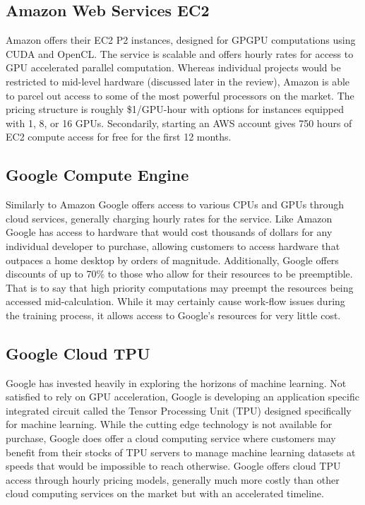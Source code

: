 \documentclass[onecolumn, draftclsnofoot,10pt, compsoc]{IEEEtran}
\begin{document}
    \subsection{Amazon Web Services EC2}
    Amazon offers their EC2 P2 instances, designed for GPGPU computations using CUDA and OpenCL. The service is scalable and offers hourly rates for access to GPU accelerated parallel computation. Whereas individual projects would be restricted to mid-level hardware (discussed later in the review), Amazon is able to parcel out access to some of the most powerful processors on the market. The pricing structure is roughly \$1/GPU-hour with options for instances equipped with 1, 8, or 16 GPUs. Secondarily, starting an AWS account gives 750 hours of EC2 compute access for free for the first 12 months.
    \subsection{Google Compute Engine}
    Similarly to Amazon Google offers access to various CPUs and GPUs through cloud services, generally charging hourly rates for the service. Like Amazon Google has access to hardware that would cost thousands of dollars for any individual developer to purchase, allowing customers to access hardware that outpaces a home desktop by orders of magnitude. Additionally, Google offers discounts of up to 70\% to those who allow for their resources to be preemptible. That is to say that high priority computations may preempt the resources being accessed mid-calculation. While it may certainly cause work-flow issues during the training process, it allows access to Google’s resources for very little cost.
    \subsection{Google Cloud TPU}
    Google has invested heavily in exploring the horizons of machine learning. Not satisfied to rely on GPU acceleration, Google is developing an application specific integrated circuit called the Tensor Processing Unit (TPU) designed specifically for machine learning. While the cutting edge technology is not available for purchase, Google does offer a cloud computing service where customers may benefit from their stocks of TPU servers to manage machine learning datasets at speeds that would be impossible to reach otherwise. Google offers cloud TPU access through hourly pricing models, generally much more costly than other cloud computing services on the market but with an accelerated timeline.
    
\end{document}
